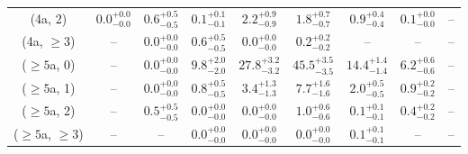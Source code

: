 \begin{table}[h!]
{\begin{tabular}{ccccccccc}
	(4a, 2) & $0.0^{+ 0.0 }_{- 0.0 }$ & $0.6^{+ 0.5 }_{- 0.5 }$ & $0.1^{+ 0.1 }_{- 0.1 }$ & $2.2^{+ 0.9 }_{- 0.9 }$ & $1.8^{+ 0.7 }_{- 0.7 }$ & $0.9^{+ 0.4 }_{- 0.4 }$ & $0.1^{+ 0.0 }_{- 0.0 }$ & -- \\[0.5ex] 
	(4a, $\ge3$) & -- & $0.0^{+ 0.0 }_{- 0.0 }$ & $0.6^{+ 0.5 }_{- 0.5 }$ & $0.0^{+ 0.0 }_{- 0.0 }$ & $0.2^{+ 0.2 }_{- 0.2 }$ & -- & -- & -- \\[0.5ex] 
	($\ge5$a, 0) & -- & $0.0^{+ 0.0 }_{- 0.0 }$ & $9.8^{+ 2.0 }_{- 2.0 }$ & $27.8^{+ 3.2 }_{- 3.2 }$ & $45.5^{+ 3.5 }_{- 3.5 }$ & $14.4^{+ 1.4 }_{- 1.4 }$ & $6.2^{+ 0.6 }_{- 0.6 }$ & -- \\[0.5ex] 
	($\ge5$a, 1) & -- & $0.0^{+ 0.0 }_{- 0.0 }$ & $0.8^{+ 0.5 }_{- 0.5 }$ & $3.4^{+ 1.3 }_{- 1.3 }$ & $7.7^{+ 1.6 }_{- 1.6 }$ & $2.0^{+ 0.5 }_{- 0.5 }$ & $0.9^{+ 0.2 }_{- 0.2 }$ & -- \\[0.5ex] 
	($\ge5$a, 2) & -- & $0.5^{+ 0.5 }_{- 0.5 }$ & $0.0^{+ 0.0 }_{- 0.0 }$ & $0.0^{+ 0.0 }_{- 0.0 }$ & $1.0^{+ 0.6 }_{- 0.6 }$ & $0.1^{+ 0.1 }_{- 0.1 }$ & $0.4^{+ 0.2 }_{- 0.2 }$ & -- \\[0.5ex] 
	($\ge5$a, $\ge3$) & -- & -- & $0.0^{+ 0.0 }_{- 0.0 }$ & $0.0^{+ 0.0 }_{- 0.0 }$ & $0.0^{+ 0.0 }_{- 0.0 }$ & $0.1^{+ 0.1 }_{- 0.1 }$ & -- & -- \\[0.5ex] 
	\hline
	\hline
\end{tabular}}
\end{table}
